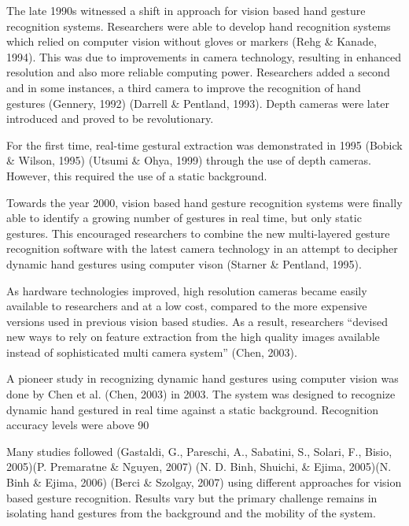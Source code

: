 The late 1990s witnessed a shift in approach for vision based hand gesture recognition systems. Researchers were able to develop hand recognition systems which relied on computer vision without gloves or markers (Rehg \& Kanade, 1994). This was due to improvements in camera technology, resulting in enhanced resolution and also more reliable computing power. Researchers added a second and in some instances, a third camera to improve the recognition of hand gestures (Gennery, 1992) (Darrell \& Pentland, 1993). Depth cameras were later introduced and proved to be revolutionary. 

For the first time, real-time gestural extraction was demonstrated in 1995 (Bobick \& Wilson, 1995) (Utsumi \& Ohya, 1999) through the use of depth cameras. However, this required the use of a static background.  

Towards the year 2000, vision based hand gesture recognition systems were finally able to identify a growing number of gestures in real time, but only static gestures. This encouraged researchers to combine the new multi-layered gesture recognition software with the latest camera technology in an attempt to decipher dynamic hand gestures using computer vison (Starner \& Pentland, 1995). 

As hardware technologies improved, high resolution cameras became easily available to researchers and at a low cost, compared to the more expensive versions used in previous vision based studies. As a result, researchers ``devised new ways to rely on feature extraction from the high quality images available instead of sophisticated multi camera system'' (Chen, 2003). 

A pioneer study in recognizing dynamic hand gestures using computer vision was done by Chen et al. (Chen, 2003) in 2003. The system was designed to recognize dynamic hand gestured in real time against a static background. Recognition accuracy levels were above 90%

Many studies followed (Gastaldi, G., Pareschi, A., Sabatini, S., Solari, F., Bisio, 2005)(P. Premaratne \& Nguyen, 2007) (N. D. Binh, Shuichi, \& Ejima, 2005)(N. Binh \& Ejima, 2006) (Berci \& Szolgay, 2007) using different approaches for vision based gesture recognition. Results vary but the primary challenge remains in isolating hand gestures from the background and the mobility of the system. 


